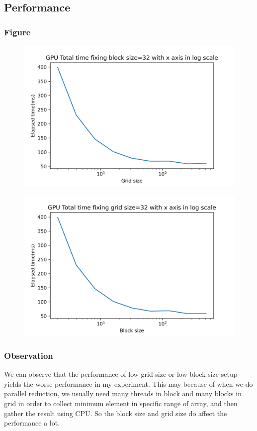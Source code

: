\documentclass{article}
\begin{document}
	\subsection{Performance}
	\subsubsection{Figure}
	\newpage
	\begin{figure}
		\centering
		\includegraphics[width=\linewidth]{notebook/gpu_total_time_fixing_block_size}
	\end{figure}
	\begin{figure}[hb!]
		\centering
		\includegraphics[width=\linewidth]{notebook/gpu_total_time_fixing_grid_size}
	\end{figure}
	\subsubsection{Observation}
	We can observe that the performance of low grid size or low block size setup yields the worse performance in my experiment. This may because of when we do parallel reduction, we usually need many threads in block and many blocks in grid in order to collect minimum element in specific range of array, and then gather the result using CPU. So the block size and grid size do affect the performance a lot.
	
\end{document}
